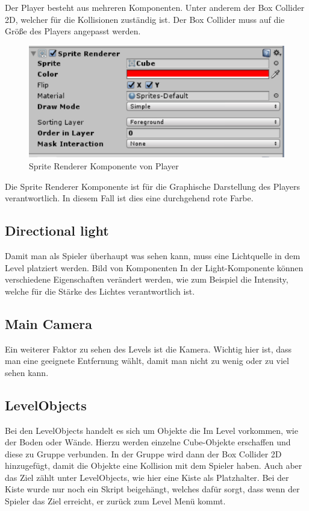 Der Player besteht aus mehreren Komponenten. Unter anderem der Box Collider 2D, welcher für die Kollisionen zuständig ist. Der Box Collider muss auf die Größe des Players angepasst werden. 
\begin{figure}[H]
	\includegraphics[width=15cm]{images/SpriteRenderer.png}
	\caption{Sprite Renderer Komponente von Player}
\end{figure}
Die Sprite Renderer Komponente ist für die Graphische Darstellung des Players verantwortlich. In diesem Fall ist dies eine durchgehend rote Farbe.

\subsection{Directional light}
Damit man als Spieler überhaupt was sehen kann, muss eine Lichtquelle in dem Level platziert werden.
Bild von Komponenten
In der Light-Komponente können verschiedene Eigenschaften verändert werden, wie zum Beispiel die Intensity, welche für die Stärke des Lichtes verantwortlich ist.
\subsection{Main Camera}
Ein weiterer Faktor zu sehen des Levels ist die Kamera. Wichtig hier ist, dass man eine geeignete Entfernung wählt, damit man nicht zu wenig oder zu viel sehen kann.
\subsection{LevelObjects}
Bei den LevelObjects handelt es sich um Objekte die Im Level vorkommen, wie der Boden oder Wände. Hierzu werden einzelne Cube-Objekte erschaffen und diese zu Gruppe verbunden. In der Gruppe wird dann der Box Collider 2D hinzugefügt, damit die Objekte eine Kollision mit dem Spieler haben. Auch aber das Ziel zählt unter LevelObjects, wie hier eine Kiste als Platzhalter. Bei der Kiste wurde nur noch ein Skript beigehängt, welches dafür sorgt, dass wenn der Spieler das Ziel erreicht, er zurück zum Level Menü kommt.

